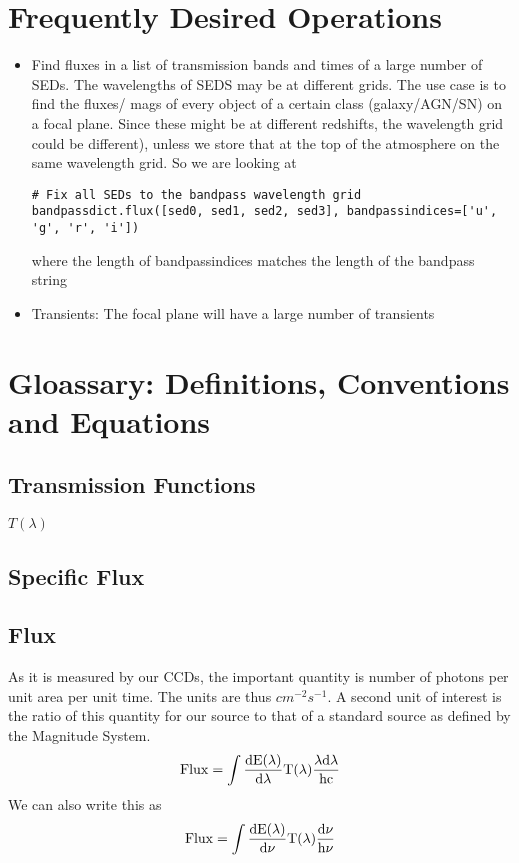 \documentclass{article}[12pt]
\begin{document}
\section{Frequently Desired Operations}

\begin{itemize}
    \item Find fluxes in a list of transmission bands and times of a large number of SEDs. The wavelengths of SEDS may be at different grids. The use case is to find the fluxes/ mags of every object of a certain class (galaxy/AGN/SN) on a focal plane. Since these might be at different redshifts, the wavelength grid could be different), unless we store that at the top of the atmosphere on the same wavelength grid.
        So we are looking at 
\begin{verbatim}
# Fix all SEDs to the bandpass wavelength grid
bandpassdict.flux([sed0, sed1, sed2, sed3], bandpassindices=['u', 'g', 'r', 'i'])
\end{verbatim}
where the length of bandpassindices matches the length of the bandpass string
    \item Transients: The focal plane will have a large number of transients 
\end{itemize}

\section{Gloassary: Definitions, Conventions and Equations}

\subsection{Transmission Functions} $T(\lambda)$ 

\subsection{Specific Flux} 

\subsection{Flux} As it is measured by our CCDs, the important quantity is 
number of photons per unit area per unit time. The units are thus
$cm^{-2} s^{-1}$. A second unit of interest is the ratio of this quantity for our source to that of a standard source as defined by the Magnitude System.
\begin{equation}
\rm{Flux} = \int \frac{dE(\lambda)}{d\lambda} T(\lambda)
    \frac{\lambda d\lambda}{hc}
\end{equation}
We can also write this as 
\begin{equation}
    \rm{Flux} = \int \frac{dE(\lambda)}{d\nu} T(\lambda) \frac{d\nu}{h\nu}
\end{equation}
\end{document}

